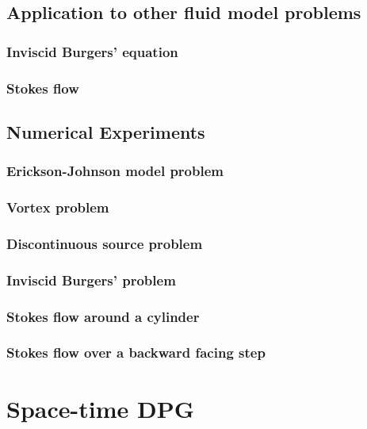 \documentclass[12pt]{report}
\begin{document}
\section{Application to other fluid model problems}

\subsection{Inviscid Burgers' equation}

\subsection{Stokes flow}


\section{Numerical Experiments}

\subsection{Erickson-Johnson model problem}

\subsection{Vortex problem}

\subsection{Discontinuous source problem}

\subsection{Inviscid Burgers' problem}

\subsection{Stokes flow around a cylinder}

\subsection{Stokes flow over a backward facing step}



\chapter{Space-time DPG}
\end{document}
